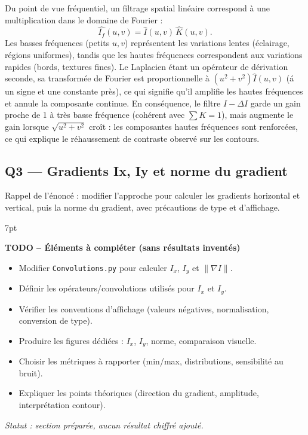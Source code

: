 \documentclass[11pt,a4paper]{article}
\newenvironment{formal}{%
\def\FrameCommand{%
  \hspace{1pt}%
  {\color{enstaBleuFonce}\vrule width 2pt}%
  {\color{formalshade}\vrule width 4pt}%
  \colorbox{formalshade}%
}%
\MakeFramed{\advance\hsize-\width\FrameRestore}%
\noindent\hspace{-4.55pt}%
\begin{adjustwidth}{}{7pt}%
\vspace{4pt}%
}{%
\vspace{4pt}\end{adjustwidth}\endMakeFramed%
}
\begin{document}
Du point de vue fr\'equentiel, un filtrage spatial lin\'eaire correspond \`a une multiplication dans le domaine de Fourier :
\[
\widehat{I_f}(u,v)=\widehat{I}(u,v)\,\widehat{K}(u,v).
\]
Les basses fr\'equences (petits \(u,v\)) repr\'esentent les variations lentes (\'eclairage, r\'egions uniformes), tandis que les hautes fr\'equences correspondent aux variations rapides (bords, textures fines). Le Laplacien \'etant un op\'erateur de d\'erivation seconde, sa transform\'ee de Fourier est proportionnelle \`a \((u^2+v^2)\widehat{I}(u,v)\) (\'a un signe et une constante pr\`es), ce qui signifie qu'il amplifie les hautes fr\'equences et annule la composante continue. En cons\'equence, le filtre \(I-\Delta I\) garde un gain proche de 1 \`a tr\`es basse fr\'equence (coh\'erent avec \(\sum K = 1\)), mais augmente le gain lorsque \(\sqrt{u^2+v^2}\) cro\^it : les composantes hautes fr\'equences sont renforc\'ees, ce qui explique le r\'ehaussement de contraste observ\'e sur les contours.

\subsection{Q3 --- Gradients Ix, Iy et norme du gradient}
Rappel de l'énoncé : modifier l'approche pour calculer les gradients horizontal et vertical, puis la norme du gradient, avec précautions de type et d'affichage.

\begin{formal}
\textbf{TODO -- Éléments à compléter (sans résultats inventés)}
\begin{itemize}[leftmargin=1.5em]
  \item Modifier \texttt{Convolutions.py} pour calculer \(I_x\), \(I_y\) et \(\|\nabla I\|\).
  \item Définir les opérateurs/convolutions utilisés pour \(I_x\) et \(I_y\).
  \item Vérifier les conventions d'affichage (valeurs négatives, normalisation, conversion de type).
  \item Produire les figures dédiées : \(I_x\), \(I_y\), norme, comparaison visuelle.
  \item Choisir les métriques à rapporter (min/max, distributions, sensibilité au bruit).
  \item Expliquer les points théoriques (direction du gradient, amplitude, interprétation contour).
\end{itemize}
\end{formal}
\textit{Statut : section préparée, aucun résultat chiffré ajouté.}
\end{document}

